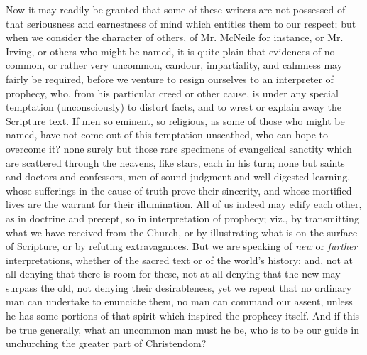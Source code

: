 Now it may readily be granted that some of these writers are not
possessed of that seriousness and earnestness of mind which
entitles them to our respect; but when we consider the character of
others, of Mr. McNeile for instance, or Mr. Irving, or others who
might be named, it is quite plain that evidences of no common, or
rather very uncommon, candour, impartiality, and calmness may fairly
be required, before we venture to resign ourselves to an interpreter
of prophecy, who, from his particular creed or other cause, is under
any special temptation (unconsciously) to distort facts, and to wrest
or explain away the Scripture text. If men so eminent, so religious,
as some of those who might be named, have not come out of this
temptation unscathed, who can hope to overcome it? none surely but
those rare specimens of evangelical sanctity which are scattered
through the heavens, like stars, each in his turn; none but saints and
doctors and confessors, men of sound judgment and well-digested
learning, whose sufferings in the cause of truth prove their
sincerity, and whose mortified lives are the warrant for their
illumination. All of us indeed may edify each other, as in doctrine
and precept, so in interpretation of prophecy; viz., by transmitting
what we have received from the Church, or by illustrating what is on
the surface of Scripture, or by refuting extravagances. But we are
speaking of \emph{new} or \emph{further} interpretations, whether of
the sacred text or of the world's history: and, not at all denying
that there is room for these, not at all denying that the new may
surpass the old, not denying their desirableness, yet we repeat that
no ordinary man can undertake to enunciate them, no man can command
our assent, unless he has some portions of that spirit which inspired
the prophecy itself. And if this be true generally, what an uncommon
man must he be, who is to be our guide in unchurching the greater part
of Christendom?

